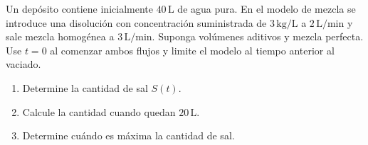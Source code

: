 Un depósito contiene inicialmente $40\,\mathrm L$ de agua pura. En el modelo de mezcla se introduce una disolución con concentración suministrada de $3\,\mathrm{kg/L}$ a $2\,\mathrm{L/min}$ y sale mezcla homogénea a $3\,\mathrm{L/min}$. Suponga volúmenes aditivos y mezcla perfecta. Use $t=0$ al comenzar ambos flujos y limite el modelo al tiempo anterior al vaciado.

\begin{enumerate}[label=(\alph*),ref=\alph*,leftmargin=*]
\item Determine la cantidad de sal $S(t)$.
\item Calcule la cantidad cuando quedan $20\,\mathrm L$.
\item Determine cuándo es máxima la cantidad de sal.
\end{enumerate}
